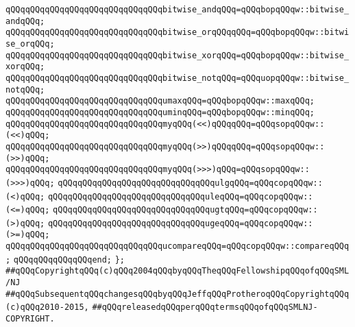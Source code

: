 \verb|qQQqqQQqqQQqqQQqqQQqqQQqqQQqqQQqbitwise_andqQQq=qQQqbopqQQqw::bitwise_andqQQq;|\newline
\verb|qQQqqQQqqQQqqQQqqQQqqQQqqQQqqQQqbitwise_orqQQqqQQq=qQQqbopqQQqw::bitwise_orqQQq;|\newline
\verb|qQQqqQQqqQQqqQQqqQQqqQQqqQQqqQQqbitwise_xorqQQq=qQQqbopqQQqw::bitwise_xorqQQq;|\newline
\newline
\verb|qQQqqQQqqQQqqQQqqQQqqQQqqQQqqQQqbitwise_notqQQq=qQQquopqQQqw::bitwise_notqQQq;|\newline
\newline
\verb|qQQqqQQqqQQqqQQqqQQqqQQqqQQqqQQqumaxqQQq=qQQqbopqQQqw::maxqQQq;|\newline
\verb|qQQqqQQqqQQqqQQqqQQqqQQqqQQqqQQquminqQQq=qQQqbopqQQqw::minqQQq;|\newline
\newline
\verb|qQQqqQQqqQQqqQQqqQQqqQQqqQQqqQQqmyqQQq(<<)qQQqqQQq=qQQqsopqQQqw::(<<)qQQq;|\newline
\verb|qQQqqQQqqQQqqQQqqQQqqQQqqQQqqQQqmyqQQq(>>)qQQqqQQq=qQQqsopqQQqw::(>>)qQQq;|\newline
\verb|qQQqqQQqqQQqqQQqqQQqqQQqqQQqqQQqmyqQQq(>>>)qQQq=qQQqsopqQQqw::(>>>)qQQq;|\newline
\newline
\verb|qQQqqQQqqQQqqQQqqQQqqQQqqQQqqQQqulgqQQq=qQQqcopqQQqw::(<)qQQq;|\newline
\verb|qQQqqQQqqQQqqQQqqQQqqQQqqQQqqQQquleqQQq=qQQqcopqQQqw::(<=)qQQq;|\newline
\verb|qQQqqQQqqQQqqQQqqQQqqQQqqQQqqQQqugtqQQq=qQQqcopqQQqw::(>)qQQq;|\newline
\verb|qQQqqQQqqQQqqQQqqQQqqQQqqQQqqQQqugeqQQq=qQQqcopqQQqw::(>=)qQQq;|\newline
\newline
\verb|qQQqqQQqqQQqqQQqqQQqqQQqqQQqqQQqucompareqQQq=qQQqcopqQQqw::compareqQQq;|\newline
\verb|qQQqqQQqqQQqqQQqend;|\newline
\verb|};|\newline
\newline
\newline
\verb|##qQQqCopyrightqQQq(c)qQQq2004qQQqbyqQQqTheqQQqFellowshipqQQqofqQQqSML/NJ|\newline
\verb|##qQQqSubsequentqQQqchangesqQQqbyqQQqJeffqQQqProtheroqQQqCopyrightqQQq(c)qQQq2010-2015,|\newline
\verb|##qQQqreleasedqQQqperqQQqtermsqQQqofqQQqSMLNJ-COPYRIGHT.|\newline

